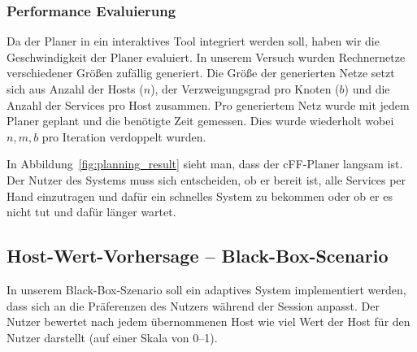 \subsubsection{Performance Evaluierung}

Da der Planer in ein interaktives Tool integriert werden soll, haben
wir die Geschwindigkeit der Planer evaluiert. In unserem Versuch
wurden Rechnernetze verschiedener Größen zufällig generiert. Die
Größe der generierten Netze setzt sich aus Anzahl der Hosts ($n$), der
Verzweigungsgrad pro Knoten ($b$) und die Anzahl der Services pro Host zusammen.
Pro generiertem Netz wurde mit jedem Planer geplant und die benötigte
Zeit gemessen. Dies wurde wiederholt wobei $n,m,b$ pro Iteration
verdoppelt wurden.

In Abbildung~\ref{fig:planning_result} sieht man, dass der cFF-Planer
langsam ist. Der Nutzer des Systems muss sich entscheiden, ob er bereit
ist, alle Services per Hand einzutragen und dafür ein schnelles System
zu bekommen oder ob er es nicht tut und dafür länger wartet.

\begin{figure*}
  \centering
  \caption{Die Ergebnisse des Geschwindigkeitstests mit FF und cFF}
  \label{fig:planning_result}
\end{figure*}	

\subsection{Host-Wert-Vorhersage -- Black-Box-Scenario}

In unserem Black-Box-Szenario soll ein adaptives System
implementiert werden, dass sich an die Präferenzen des Nutzers während
der Session anpasst. Der Nutzer bewertet nach jedem übernommenen Host
wie viel Wert der Host für den Nutzer darstellt (auf einer Skala von 0--1).

